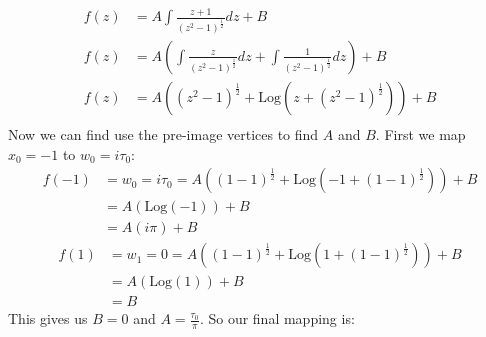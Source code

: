 \begin{example}
\begin{align}
        f(z)  & = A\int \frac{z + 1}{(z^2 - 1)^{\frac{1}{2}}}dz + B                                                     \\
        f(z)  & = A\left(\int \frac{z}{(z^2 - 1)^{\frac{1}{2}}}dz + \int \frac{1}{(z^2 - 1)^{\frac{1}{2}}}dz\right) + B \\
        f(z)  & = A\left((z^2 -1)^\frac{1}2+ \text{Log}(z+ (z^2 -1)^\frac{1}2)\right) + B                               \\
    \end{align}
    Now we can find use the pre-image vertices to find $A$ and $B$. First we map $x_0 = -1$ to $w_0 = i\tau_0$:
    \begin{align}
        f(-1) & = w_0 = i\tau_0 = A\left((1 -1)^\frac{1}2+ \text{Log}(-1+ (1 -1)^\frac{1}2)\right) + B \\
              & = A(\text{Log}(-1)) + B                                                                \\
              & = A(i\pi) + B
    \end{align}
    \begin{align*}
        f(1) & = w_1 = 0 = A\left((1 -1)^\frac{1}2+ \text{Log}(1+ (1 -1)^\frac{1}2)\right) + B \\
             & = A(\text{Log}(1)) + B                                                          \\
             & = B
    \end{align*}
    This gives us $B = 0$ and $A = \frac{\tau_0}{\pi}$. So our final mapping is:
\end{example}

